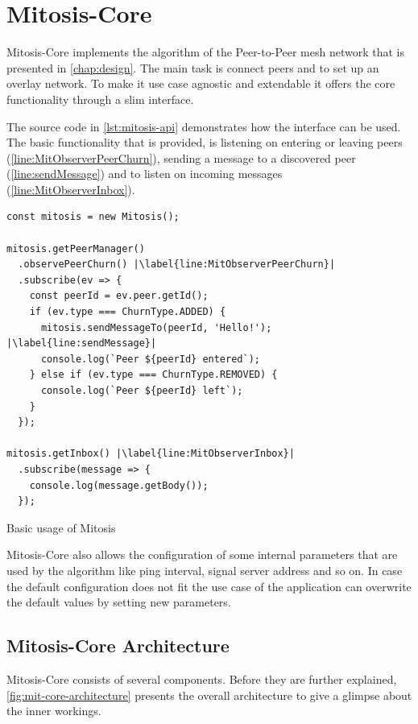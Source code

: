 \section{Mitosis-Core}
Mitosis-Core implements the algorithm of the Peer-to-Peer mesh network that is presented in \vref{chap:design}. The main task is connect peers and to set up an overlay network. To make it use case agnostic and extendable it offers the core functionality through a slim interface.

The source code in \vref{lst:mitosis-api} demonstrates how the interface can be used.
The basic functionality that is provided, is listening on entering or leaving peers (\cref{line:MitObserverPeerChurn}), sending a message to a discovered peer (\cref{line:sendMessage}) and to listen on incoming messages (\cref{line:MitObserverInbox}).

\begin{Listing}[htb!]
\begin{lstlisting}[basicstyle=\tiny,basicstyle=\footnotesize\ttfamily,xleftmargin=3em]
const mitosis = new Mitosis();

mitosis.getPeerManager()
  .observePeerChurn() |\label{line:MitObserverPeerChurn}|
  .subscribe(ev => {
    const peerId = ev.peer.getId();
    if (ev.type === ChurnType.ADDED) {
      mitosis.sendMessageTo(peerId, 'Hello!'); |\label{line:sendMessage}|
      console.log(`Peer ${peerId} entered`);
    } else if (ev.type === ChurnType.REMOVED) {
      console.log(`Peer ${peerId} left`);
    }
  });
  
mitosis.getInbox() |\label{line:MitObserverInbox}|
  .subscribe(message => {
    console.log(message.getBody());
  });
\end{lstlisting}
\caption{Basic usage of Mitosis}
\label{lst:mitosis-api}
\end{Listing}

Mitosis-Core also allows the configuration of some internal parameters that are used by the algorithm like ping interval, signal server address and so on. In case the default configuration does not fit the use case of the application can overwrite the default values by setting new  parameters.

\subsection{Mitosis-Core Architecture}
Mitosis-Core consists of several components. Before they are further explained, \vref{fig:mit-core-architecture} presents the overall architecture to give a glimpse about the inner workings.


